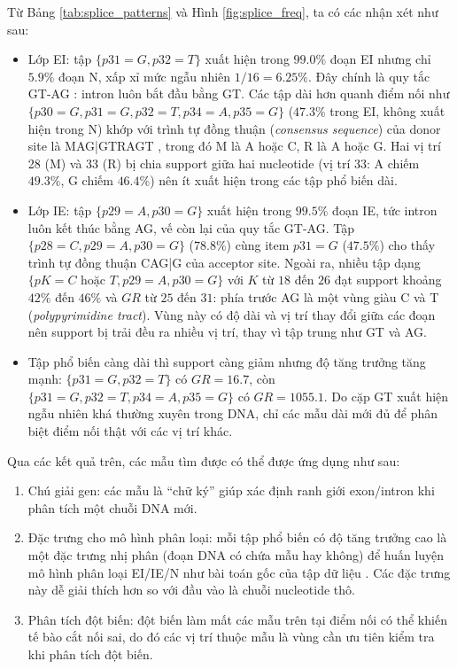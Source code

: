 \documentclass[conference]{IEEEtran}
\begin{document}
Từ Bảng \ref{tab:splice_patterns} và Hình \ref{fig:splice_freq}, ta có các nhận xét như sau:
\begin{itemize}
    \item Lớp EI: tập $\{p31{=}G, p32{=}T\}$ xuất hiện trong $99.0\%$ đoạn EI nhưng chỉ $5.9\%$ đoạn N, xấp xỉ mức ngẫu nhiên $1/16 = 6.25\%$. Đây chính là quy tắc GT-AG \cite{mount1982catalogue}: intron luôn bắt đầu bằng GT. Các tập dài hơn quanh điểm nối như $\{p30{=}G, p31{=}G, p32{=}T, p34{=}A, p35{=}G\}$ ($47.3\%$ trong EI, không xuất hiện trong N) khớp với trình tự đồng thuận (\textit{consensus sequence}) của donor site là MAG|GTRAGT \cite{mount1982catalogue}, trong đó M là A hoặc C, R là A hoặc G. Hai vị trí 28 (M) và 33 (R) bị chia support giữa hai nucleotide (vị trí 33: A chiếm $49.3\%$, G chiếm $46.4\%$) nên ít xuất hiện trong các tập phổ biến dài.
    \item Lớp IE: tập $\{p29{=}A, p30{=}G\}$ xuất hiện trong $99.5\%$ đoạn IE, tức intron luôn kết thúc bằng AG, vế còn lại của quy tắc GT-AG. Tập $\{p28{=}C, p29{=}A, p30{=}G\}$ ($78.8\%$) cùng item $p31{=}G$ ($47.5\%$) cho thấy trình tự đồng thuận CAG|G của acceptor site. Ngoài ra, nhiều tập dạng $\{pK{=}C \text{ hoặc } T, p29{=}A, p30{=}G\}$ với $K$ từ $18$ đến $26$ đạt support khoảng $42\%$ đến $46\%$ và $GR$ từ $25$ đến $31$: phía trước AG là một vùng giàu C và T (\textit{polypyrimidine tract}). Vùng này có độ dài và vị trí thay đổi giữa các đoạn nên support bị trải đều ra nhiều vị trí, thay vì tập trung như GT và AG.
    \item Tập phổ biến càng dài thì support càng giảm nhưng độ tăng trưởng tăng mạnh: $\{p31{=}G, p32{=}T\}$ có $GR = 16.7$, còn $\{p31{=}G, p32{=}T, p34{=}A, p35{=}G\}$ có $GR = 1055.1$. Do cặp GT xuất hiện ngẫu nhiên khá thường xuyên trong DNA, chỉ các mẫu dài mới đủ để phân biệt điểm nối thật với các vị trí khác.
\end{itemize}

Qua các kết quả trên, các mẫu tìm được có thể được ứng dụng như sau:
\begin{enumerate}
    \item Chú giải gen: các mẫu là ``chữ ký'' giúp xác định ranh giới exon/intron khi phân tích một chuỗi DNA mới.
    \item Đặc trưng cho mô hình phân loại: mỗi tập phổ biến có độ tăng trưởng cao là một đặc trưng nhị phân (đoạn DNA có chứa mẫu hay không) để huấn luyện mô hình phân loại EI/IE/N như bài toán gốc của tập dữ liệu \cite{noordewier1991training}. Các đặc trưng này dễ giải thích hơn so với đầu vào là chuỗi nucleotide thô.
    \item Phân tích đột biến: đột biến làm mất các mẫu trên tại điểm nối có thể khiến tế bào cắt nối sai, do đó các vị trí thuộc mẫu là vùng cần ưu tiên kiểm tra khi phân tích đột biến.
\end{enumerate}
\end{document}
